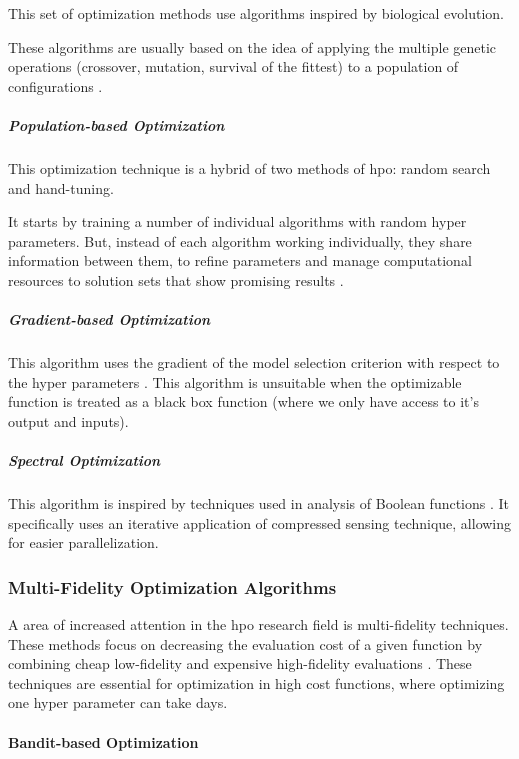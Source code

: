 This set of optimization methods use algorithms inspired by biological evolution.

These algorithms are usually based on the idea of applying the multiple genetic operations (crossover, mutation, survival of the fittest) to a population of configurations \parencite{elshawi2019automated}.

\subparagraph{Population-based Optimization}

This optimization technique is a hybrid of two methods of \acrshort{hpo}: random search and hand-tuning.

It starts by training a number of individual algorithms with random hyper parameters. But, instead of each algorithm working individually, they share information between them, to refine parameters and manage computational resources to solution sets that show promising results \parencite{jaderberg2017population}.

\subparagraph{Gradient-based Optimization}

This algorithm uses the gradient of the model selection criterion with respect to the hyper parameters \parencite{bengio2000}. This algorithm is unsuitable when the optimizable function is treated as a black box function (where we only have access to  it's output and inputs).

\subparagraph{Spectral Optimization}

This algorithm is inspired by techniques used in analysis of Boolean functions \parencite{hazan2017hyperparameter}. It specifically uses an iterative application of compressed sensing technique, allowing for easier parallelization.

\subsubsection{Multi-Fidelity Optimization Algorithms}

A area of increased attention in the \acrshort{hpo} research field is multi-fidelity techniques. These methods focus on decreasing the evaluation cost of a given function by combining cheap low-fidelity and expensive high-fidelity evaluations \parencite{elshawi2019automated}. These techniques are essential for optimization in high cost functions, where optimizing one hyper parameter can take days.

\paragraph{Bandit-based Optimization}

